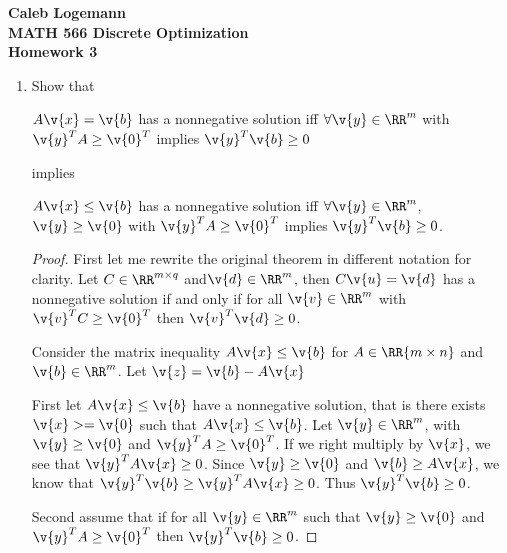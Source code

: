 \documentclass[11pt, oneside]{article}
\begin{document}
\noindent \textbf{\Large{Caleb Logemann \\
MATH 566 Discrete Optimization\\
Homework 3
}}

%
\begin{enumerate}
    \item %
        Show that
        \begin{center}
            $A\v{x} = \v{b}$ has a nonnegative solution iff
            $\forall \v{y} \in \RR^m$ with $\v{y}^T A \ge \v{0}^T$ implies
            $\v{y}^T \v{b} \ge 0$
        \end{center}
        implies
        \begin{center}
            $A\v{x} \le \v{b}$ has a nonnegative solution iff
            $\forall \v{y} \in \RR^m$, $\v{y} \ge \v{0}$ with $\v{y}^T A \ge \v{0}^T$
            implies $\v{y}^T \v{b} \ge 0$.
        \end{center}

        \begin{proof}
            First let me rewrite the original theorem in different notation for
            clarity.
            Let $C \in \RR^{m \times q}$ and$\v{d} \in \RR^m$, then
            $C\v{u} = \v{d}$ has a nonnegative solution if and only if for all
            $\v{v} \in \RR^m$ with $\v{v}^T C \ge \v{0}^T$ then
            $\v{v}^T \v{d} \ge 0$.
            
            Consider the matrix inequality $A\v{x} \le \v{b}$ for
            $A \in \RR{m \times n}$ and $\v{b} \in \RR^m$.
            Let $\v{z} = \v{b} - A\v{x}$

            First let $A\v{x} \le \v{b}$ have a nonnegative solution, that is
            there exists $\v{x} >= \v{0}$ such that $A\v{x} \le \v{b}$.
            Let $\v{y} \in \RR^m$, with $\v{y} \ge \v{0}$ and $\v{y}^T A \ge \v{0}^T$.
            If we right multiply by $\v{x}$, we see that $\v{y}^T A\v{x} \ge 0$.
            Since $\v{y} \ge \v{0}$ and $\v{b} \ge A\v{x}$, we know that
            $\v{y}^T \v{b} \ge \v{y}^T A\v{x} \ge 0$.
            Thus $\v{y}^T \v{b} \ge 0$.

            Second assume that if for all $\v{y} \in \RR^m$ such that
            $\v{y} \ge \v{0}$ and $\v{y}^T A \ge \v{0}^T$ then
            $\v{y}^T \v{b} \ge 0$.

        \end{proof}


\end{enumerate}
\end{document}
